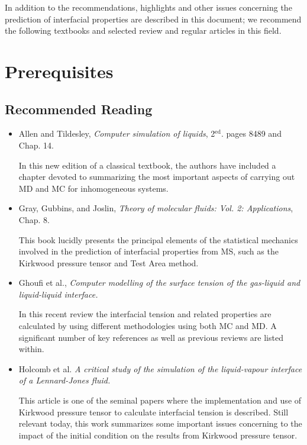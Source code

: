 \documentclass[9pt,bestpractices]{livecoms}
\begin{document}
In addition to the recommendations, highlights and other issues concerning the
prediction of interfacial properties are described in this document; we
recommend the following textbooks and selected review and regular articles in
this field. 

\section{Prerequisites}
\subsection{Recommended Reading}
\begin{itemize}
  \item Allen and Tildesley, \textit{Computer simulation of liquids}, 2$^{\mathrm{ed}}$. pages 84\textendash{}89 and Chap. 14. \citep{allen2017}

In this new edition of a classical textbook, the authors have included a chapter devoted to summarizing the most important aspects of carrying out MD and MC for inhomogeneous systems.

\item Gray, Gubbins, and Joslin, \textit{Theory of molecular fluids: Vol. 2: Applications}, Chap. 8. \citep{gray2011}

This book lucidly presents the principal elements of the statistical mechanics involved in the prediction of interfacial properties from MS, such as the Kirkwood pressure tensor and Test Area method.

\item Ghoufi et al., \textit{Computer modelling of the surface tension of the gas-liquid and liquid-liquid interface.} \citep{ghoufi2016}

  In this recent review the interfacial tension and related properties are calculated by using different methodologies using both MC and MD. A significant number of key references as well as previous reviews are listed within.

\item Holcomb et al. \textit{A critical study of the simulation of the liquid-vapour
interface of a Lennard-Jones fluid.} \citep{holcomb1993}

  This article is one of
  the seminal papers where the implementation and use of Kirkwood pressure
  tensor to calculate interfacial tension is described. Still relevant today,
  this work summarizes some important issues concerning to the impact of the
  initial condition on the results from Kirkwood pressure tensor.


\end{itemize}
\end{document}
